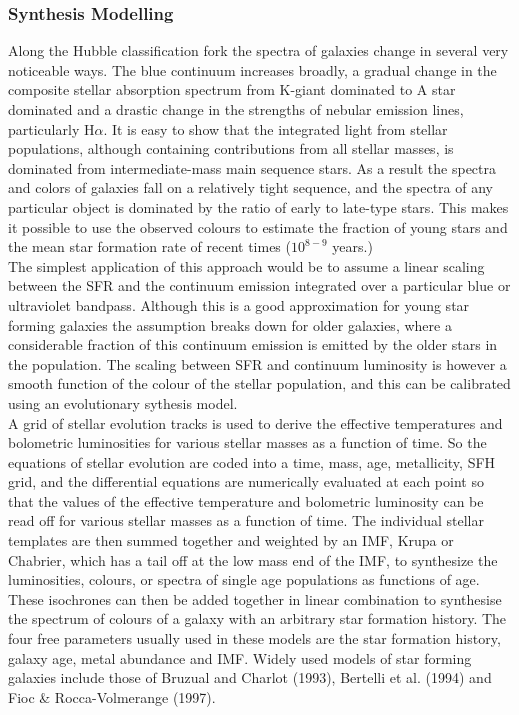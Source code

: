 \documentclass{literature}
\begin{document}
\subsubsection{Synthesis Modelling}
Along the Hubble classification fork the spectra of galaxies change in several very noticeable ways. The blue continuum increases broadly, a gradual change in the composite stellar absorption spectrum from K-giant dominated to A star dominated and a drastic change in the strengths of nebular emission lines, particularly H$\alpha$. It is easy to show that the integrated light from stellar populations, although containing contributions from all stellar masses, is dominated from intermediate-mass main sequence stars. As a result the spectra and colors of galaxies fall on a relatively tight sequence, and the spectra of any particular object is dominated by the ratio of early to late-type stars. This makes it possible to use the observed colours to estimate the fraction of young stars and the mean star formation rate of recent times ($10^{8-9}$ years.) \\
The simplest application of this approach would be to assume a linear scaling between the SFR and the continuum emission integrated over a particular blue or ultraviolet bandpass. Although this is a good approximation for young star forming galaxies the assumption breaks down for older galaxies, where a considerable fraction of this continuum emission is emitted by the older stars in the population. The scaling between SFR and continuum luminosity is however a smooth function of the colour of the stellar population, and this can be calibrated using an evolutionary sythesis model. \\
A grid of stellar evolution tracks is used to derive the effective temperatures and bolometric luminosities for various stellar masses as a function of time. So the equations of stellar evolution are coded into a time, mass, age, metallicity, SFH grid, and the differential equations are numerically evaluated at each point so that the values of the effective temperature and bolometric luminosity can be read off for various stellar masses as a function of time. The individual stellar templates are then summed together and weighted by an IMF, Krupa or Chabrier, which has a tail off at the low mass end of the IMF, to synthesize the luminosities, colours, or spectra of single age populations as functions of age. These isochrones can then be added together in linear combination to synthesise the spectrum of colours of a galaxy with an arbitrary star formation history. The four free parameters usually used in these models are the star formation history, galaxy age, metal abundance and IMF. Widely used models of star forming galaxies include those of Bruzual and Charlot  (1993), Bertelli et al. (1994) and Fioc \& Rocca-Volmerange (1997). \\ 
\end{document}
